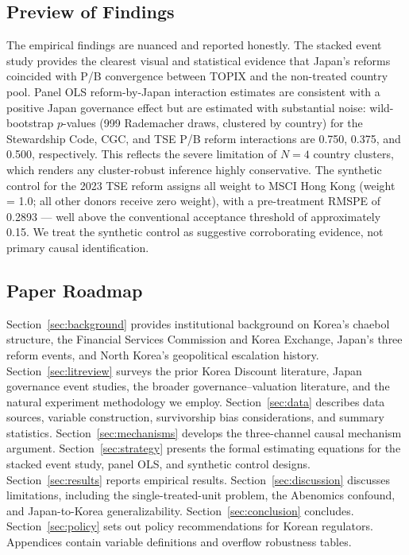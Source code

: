\documentclass[12pt]{article}
\begin{document}
\subsection*{Preview of Findings}

The empirical findings are nuanced and reported honestly. The stacked event study provides
the clearest visual and statistical evidence that Japan's reforms coincided with P/B
convergence between TOPIX and the non-treated country pool. Panel OLS reform-by-Japan
interaction estimates are consistent with a positive Japan governance effect but are estimated
with substantial noise: wild-bootstrap $p$-values (999 Rademacher draws, clustered by country)
for the Stewardship Code, CGC, and TSE P/B reform interactions are 0.750, 0.375, and 0.500,
respectively. This reflects the severe limitation of $N=4$ country clusters, which renders
any cluster-robust inference highly conservative. The synthetic control for the 2023 TSE
reform assigns all weight to MSCI Hong Kong (weight = 1.0; all other donors receive zero
weight), with a pre-treatment RMSPE of 0.2893 --- well above the conventional acceptance
threshold of approximately 0.15. We treat the synthetic control as suggestive corroborating
evidence, not primary causal identification.

\subsection*{Paper Roadmap}

Section~\ref{sec:background} provides institutional background on Korea's chaebol structure,
the Financial Services Commission and Korea Exchange, Japan's three reform events, and
North Korea's geopolitical escalation history. Section~\ref{sec:litreview} surveys the prior
Korea Discount literature, Japan governance event studies, the broader governance--valuation
literature, and the natural experiment methodology we employ. Section~\ref{sec:data} describes
data sources, variable construction, survivorship bias considerations, and summary statistics.
Section~\ref{sec:mechanisms} develops the three-channel causal mechanism argument.
Section~\ref{sec:strategy} presents the formal estimating equations for the stacked event
study, panel OLS, and synthetic control designs. Section~\ref{sec:results} reports empirical
results. Section~\ref{sec:discussion} discusses limitations, including the single-treated-unit
problem, the Abenomics confound, and Japan-to-Korea generalizability. Section~\ref{sec:conclusion}
concludes. Section~\ref{sec:policy} sets out policy recommendations for Korean regulators.
Appendices contain variable definitions and overflow robustness tables.
\end{document}
